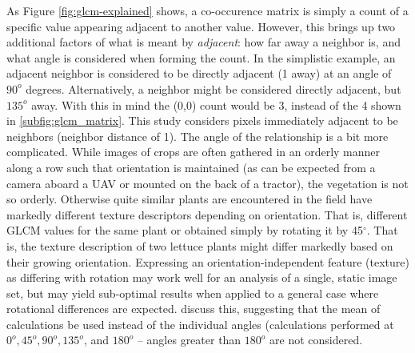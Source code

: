 \documentclass[letterpaper]{article}
\begin{document}
{As Figure \ref{fig:glcm-explained} shows, a co-occurence matrix is simply a count of a specific value appearing adjacent to another value. However, this brings up two additional factors of what is meant by \textit{adjacent}: how far away a neighbor is, and what angle is considered when forming the count. In the simplistic example, an adjacent neighbor is considered to be directly adjacent (1 away) at an angle of $90^o$ degrees. Alternatively, a neighbor might be considered directly adjacent, but $135^o$ away.  With this in mind the (0,0) count would be 3, instead of the 4 shown in \ref{subfig:glcm_matrix}. This study considers pixels immediately adjacent to be neighbors (neighbor distance of 1). The angle of the relationship is a bit more complicated. While images of crops are often gathered in an orderly manner along a row such that orientation is maintained (as can be expected from a camera aboard a UAV or mounted on the back of a tractor), the vegetation is not so orderly. Otherwise quite similar plants are encountered in the field have markedly different texture descriptors depending on orientation. That is, different GLCM values for the same plant or obtained simply by rotating it by 45$^{\circ}$. That is, the texture description of two lettuce plants might differ markedly based on their growing orientation. Expressing an orientation-independent feature (texture) as differing with rotation may work well for an analysis of a single, static image set, but may yield sub-optimal results when applied to a general case where rotational differences are expected. \citeauthor*{Haralick1973-gr} discuss this, suggesting that the mean of calculations be used instead of the individual angles (calculations performed at $0^o, 45^o, 90^o, 135^o$, and $180^o$ -- angles greater than $180^o$ are not considered.

}
\end{document}
